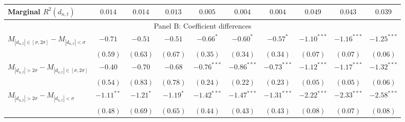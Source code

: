 \begin{tabular}{lccccccccc}
  Marginal $R^2(d_{n,t})$ & $0.014$ & $0.014$ & $0.013$ & $0.005$ & $0.004$ & $0.004$ & $0.049$ & $0.043$ & $0.039$ \\ 
   \hline \multicolumn{10}{c}{Panel B: Coefficient differences} \\
 \hline$M_{|d_{n,t}| \in [\sigma, 2\sigma]} - M_{|d_{n,t}| < \sigma}$ & $-0.71$ & $-0.51$ & $-0.51$ & $-0.66^{*}$ & $-0.60^{*}$ & $-0.57^{*}$ & $-1.10^{***}$ & $-1.16^{***}$ & $-1.25^{***}$ \\ 
   & $(0.59)$ & $(0.63)$ & $(0.67)$ & $(0.35)$ & $(0.34)$ & $(0.34)$ & $(0.07)$ & $(0.07)$ & $(0.06)$ \\ 
  $M_{|d_{n,t}| > 2 \sigma} - M_{|d_{n,t}| \in [\sigma, 2\sigma]}$ & $-0.40$ & $-0.70$ & $-0.68$ & $-0.76^{***}$ & $-0.86^{***}$ & $-0.73^{***}$ & $-1.12^{***}$ & $-1.17^{***}$ & $-1.32^{***}$ \\ 
   & $(0.54)$ & $(0.83)$ & $(0.78)$ & $(0.24)$ & $(0.22)$ & $(0.23)$ & $(0.05)$ & $(0.05)$ & $(0.06)$ \\ 
  $M_{|d_{n,t}| > 2 \sigma} - M_{|d_{n,t}| < \sigma}$ & $-1.11^{**}$ & $-1.21^{*}$ & $-1.19^{*}$ & $-1.42^{***}$ & $-1.47^{***}$ & $-1.31^{***}$ & $-2.22^{***}$ & $-2.33^{***}$ & $-2.58^{***}$ \\ 
   & $(0.48)$ & $(0.69)$ & $(0.65)$ & $(0.44)$ & $(0.43)$ & $(0.43)$ & $(0.08)$ & $(0.07)$ & $(0.08)$ \\ 
   \hline 
\end{tabular}
